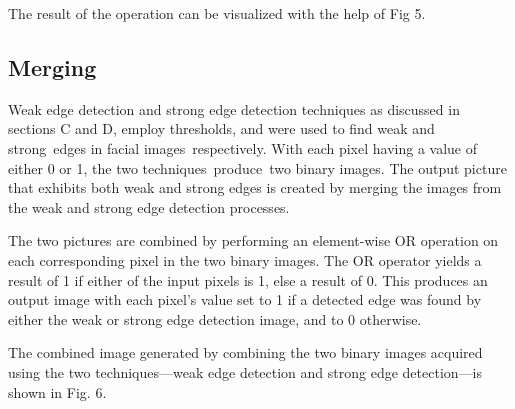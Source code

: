 \documentclass{70_styles/svproc}
\begin{document}
The result of the operation can be visualized with the help of Fig 5.

\subsection{Merging}
Weak edge detection and strong edge detection techniques as discussed in sections C and D, employ thresholds, and were used to find weak and strong edges in facial images respectively. With each pixel having a value of either 0 or 1, the two techniques produce two binary images.  The output picture that exhibits both weak and strong edges is created by merging the images from the weak and strong edge detection processes.

The two pictures are combined by performing an element-wise OR operation on each corresponding pixel in the two binary images. The OR operator yields a result of 1 if either of the input pixels is 1, else a result of 0.  This produces an output image with each pixel's value set to 1 if a detected edge was found by either the weak or strong edge detection image, and to 0 otherwise.

The combined image generated by combining the two binary images acquired using the two techniques—weak edge detection and strong edge detection—is shown in Fig. 6.
\end{document}
